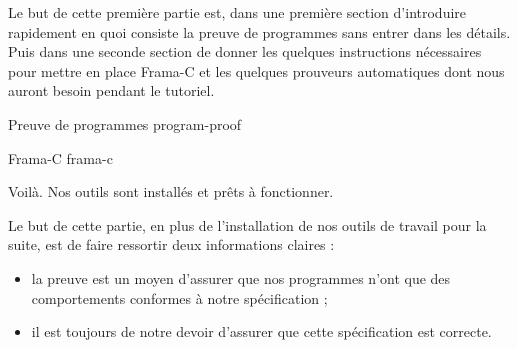
Le but de cette première partie est, dans une première section d'introduire
rapidement en quoi consiste la preuve de programmes sans entrer dans les 
détails. Puis dans une seconde section de donner les quelques instructions 
nécessaires pour mettre en place Frama-C et les quelques prouveurs 
automatiques dont nous auront besoin pendant le tutoriel.


\begin{levelTwo}
  {Preuve de programmes}
  {program-proof}
\end{levelTwo}


\begin{levelTwo}
  {Frama-C}
  {frama-c}
\end{levelTwo}


\horizontalLine



Voilà. Nos outils sont installés et prêts à fonctionner.



Le but de cette partie, en plus de l'installation de nos outils de travail
pour la suite, est de faire ressortir deux informations claires :



\begin{itemize}
\item la preuve est un moyen d'assurer que nos programmes n'ont que des 
comportements conformes à notre spécification ;
\item il est toujours de notre devoir d'assurer que cette spécification est
correcte.
\end{itemize}
